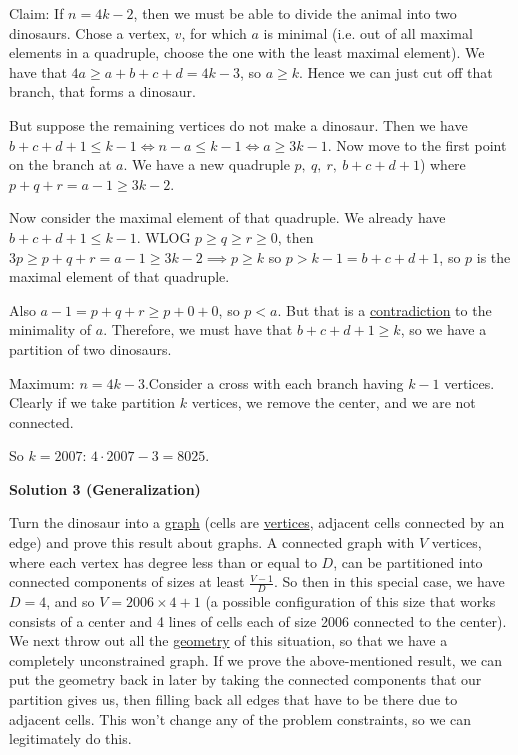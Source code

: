 \begin{enumerate}
 Claim: If $n=4k-2$, then we must be able to divide the animal into two dinosaurs. Chose a vertex, $v$, for which $a$ is minimal (i.e. out of all maximal elements in a quadruple, choose the one with the least maximal element).  We have that $4a \ge a+b+c+d=4k-3$, so $a\ge k$. Hence we can just cut off that branch, that forms a dinosaur. 

 But suppose the remaining vertices do not make a dinosaur. Then we have $b+c+d+1\le k-1 \iff n-a\le k-1\iff a\ge 3k-1$. Now move to the first point on the branch at $a$. We have a new quadruple $p,\ q,\ r,\ b+c+d+1$) where $p+q+r=a-1\ge 3k-2$. 

 Now consider the maximal element of that quadruple. We already have $b+c+d+1\le k-1$. WLOG $p\ge q\ge r\ge 0$, then $3p\ge p+q+r=a-1\ge 3k-2\implies p\ge k$ so $p>k-1=b+c+d+1$, so $p$ is the maximal element of that quadruple. 

 Also $a-1=p+q+r\ge p+0+0$, so $p<a$. But that is a \href{https://artofproblemsolving.com/wiki/index.php?title=Contradiction}{contradiction} to the minimality of $a$. Therefore, we must have that $b+c+d+1\ge k$, so we have a partition of two dinosaurs.

 Maximum: $n=4k-3$.Consider a cross with each branch having $k-1$ vertices. Clearly if we take partition $k$ vertices, we remove the center, and we are not connected.

 So $k=2007$: $4\cdot 2007-3=8025$.

 



\textbf{Solution 3 (Generalization)}

Turn the dinosaur into a \href{https://artofproblemsolving.com/wiki/index.php?title=Graph}{graph} (cells are \href{https://artofproblemsolving.com/wiki/index.php?title=Vertex}{vertices}, adjacent cells connected by an edge) and prove this result about graphs. A connected graph with $V$ vertices, where each vertex has degree less than or equal to $D$, can be partitioned into connected components of sizes at least $\frac{V-1}{D}$. So then in this special case, we have $D = 4$, and so $V = 2006 \times 4+1$ (a possible configuration of this size that works consists of a center and 4 lines of cells each of size 2006 connected to the center). We next throw out all the \href{https://artofproblemsolving.com/wiki/index.php?title=Geometry}{geometry} of this situation, so that we have a completely unconstrained graph. If we prove the above-mentioned result, we can put the geometry back in later by taking the connected components that our partition gives us, then filling back all edges that have to be there due to adjacent cells. This won't change any of the problem constraints, so we can legitimately do this. 


\end{enumerate}
